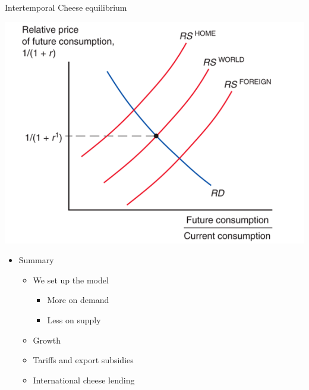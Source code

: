 \documentclass[ignorenonframetext,]{beamer}
\begin{document}
\begin{frame}{Intertemporal Cheese equilibrium}

    \includegraphics[scale=0.25]{intertemporal_cheese.png}

\end{frame}

\begin{frame}
\begin{itemize}
\itemsep1pt\parskip0pt
\item
  Summary 
  \begin{itemize}
        \item We set up the model
        \begin{itemize}
            \item More on demand
            \item Less on supply
        \end{itemize}
        \item Growth
        \item Tariffs and export subsidies
        \item International cheese lending
    \end{itemize}
\end{itemize}

\end{frame}
\end{document}
